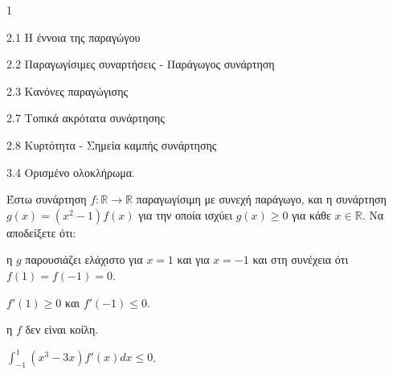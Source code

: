 \begin{ylh}{1}
    \item 2.1 Η έννοια της παραγώγου
    \item 2.2 Παραγωγίσιμες συναρτήσεις - Παράγωγος συνάρτηση
    \item 2.3 Κανόνες παραγώγισης
    \item 2.7 Τοπικά ακρότατα συνάρτησης
    \item 2.8 Κυρτότητα - Σημεία καμπής συνάρτησης
    \item 3.4 Ορισμένο ολοκλήρωμα.
\end{ylh}
Έστω συνάρτηση $f: \mathbb{R} \to \mathbb{R}$ παραγωγίσιμη με συνεχή παράγωγο, και η συνάρτηση $g(x)=(x^2-1)f(x)$ για την οποία ισχύει $g(x) \ge 0$ για κάθε $x \in \mathbb{R}$. Να αποδείξετε ότι:
\begin{alist}
\item η $g$ παρουσιάζει ελάχιστο για $x=1$ και για $x=-1$ και στη συνέχεια ότι $f(1)=f(-1)=0$. 
\item $f'(1) \ge 0$ και $f'(-1) \le 0$. 
\item η $f$ δεν είναι κοίλη. 
\item $\int_{-1}^{1} (x^3-3x) f'(x)dx \le 0$. 
\end{alist}